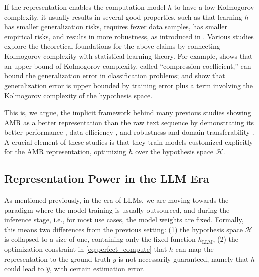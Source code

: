 If the representation enables the computation model $h$ to have
a low Kolmogorov complexity, it usually results in several good properties,
such as that learning $h$ has smaller generalization risks, requires fewer data samples, has smaller empirical risks, and 
results in more robustness, as introduced in \citet{jin-etal-2021-causal}. 
Various studies explore the theoretical foundations for the above claims by connecting Kolmogorov complexity with statistical learning theory. For example, \citet[§4.6.1]{vapnik1995nature} shows that an upper bound of Kolmogorov complexity, called ``compression coefficient,'' can bound the generalization error in classification problems; 
\citet[Eq.~3]{shalevshwartz2014understanding} and \citet{goldblum2023free} show that generalization error is upper bounded by training error plus a term involving the Kolmogorov complexity of the hypothesis space.

This is, we argue, the implicit framework behind many previous studies showing AMR as a better representation than the raw text sequence by demonstrating its better performance \citep{turian2010word}, data efficiency \citep{liu2102representation}, and robustness and domain transferability \citep{li2016learning,jin-etal-2021-causal}.
A crucial element of these studies is that they train models customized explicitly for the AMR representation, optimizing $h$ over the hypothesis space $\mathcal{H}$.







\subsection{Representation Power in the LLM Era}\label{sec:llm_repr}

As mentioned previously, in the era of LLMs, we are moving towards the paradigm where the model training is usually outsourced, and during the inference stage, i.e., for most use cases, the model weights are fixed.
Formally, this means two differences from the previous setting: (1) the hypothesis space $\mathcal{H}$ is collapsed to a size of one, containing only the fixed function $h_{\mathrm{LLM}}$, (2) the optimization constraint in \cref{eq:perfect_compute} that $h$ can map the representation to the ground truth $y$ is not necessarily guaranteed, namely that $h$ could lead to $\hat{y}$, with certain estimation error.

